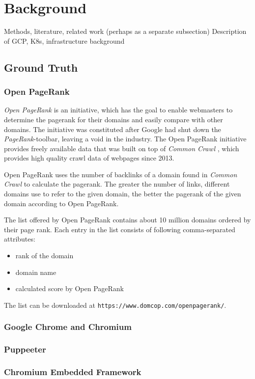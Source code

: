 \section{Background}
Methods, literature, related work (perhaps as a separate subsection)
Description of GCP, K8s, infrastructure background

\subsection{Ground Truth}
\subsubsection{Open PageRank}
\label{OpenPageRank}
\textit{Open PageRank} \cite{OpenPageRank} is an initiative, which has the goal to enable webmasters to determine the pagerank for their domains and easily compare with other domains. The initiative was constituted after Google had shut down the \textit{PageRank}-toolbar, leaving a void in the industry. The Open PageRank initiative provides freely available data that was built on top of \textit{Common Crawl} \cite{CommonCrawl}, which provides high quality crawl data of webpages since 2013.

Open PageRank uses the number of backlinks of a domain found in \textit{Common Crawl} to calculate the pagerank. The greater the number of links, different domains use to refer to the given domain, the better the pagerank of the given domain according to Open PageRank.

The list offered by Open PageRank contains about 10 million domains ordered by their page rank. Each entry in the list consists of following comma-separated attributes:

\begin{itemize}
	\item rank of the domain
	\item domain name
	\item calculated score by Open PageRank
\end{itemize}

The list can be downloaded at \texttt{https://www.domcop.com/openpagerank/}.

\subsubsection{Google Chrome and Chromium}
\label{chrome_chromium}

\subsubsection{Puppeeter}
\label{puppeeter}

\subsubsection{Chromium Embedded Framework}
\label{cef}